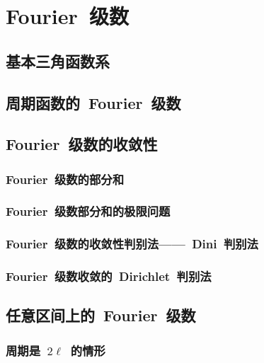 

\chapter{Fourier~级数}\label{ch:14}
\section{基本三角函数系}
\begin{exercise}

\end{exercise}
\section{周期函数的~Fourier~级数}
\begin{exercise}

\end{exercise}
\section{Fourier~级数的收敛性}
\subsection{Fourier~级数的部分和}
\subsection{Fourier~级数部分和的极限问题}
\subsection{Fourier~级数的收敛性判别法——~Dini~判别法}
\subsection{Fourier~级数收敛的~Dirichlet~判别法}
\begin{exercise}

\end{exercise}
\section{任意区间上的~Fourier~级数}
\subsection{周期是~$2\ell$~的情形}
